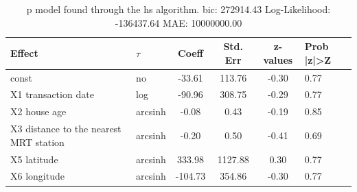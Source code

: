 \begin{table}
	\caption{p model found through the hs algorithm. bic: 272914.43 Log-Likelihood: -136437.64 MAE: 10000000.00}
	\begin{center}
		\begin{tabular}{|l|l|c|c|c|l|}
			\hline
			Effect & $\tau$ & Coeff & Std. Err & z-values & Prob |z|>Z \\
			\hline
			const & no & -33.61 & 113.76 & -0.30 & 0.77 \\
			\hline
			X1 transaction date & log & -90.96 & 308.75 & -0.29 & 0.77 \\
			\hline
			X2 house age & arcsinh & -0.08 & 0.43 & -0.19 & 0.85 \\
			\hline
			X3 distance to the nearest MRT station & arcsinh & -0.20 & 0.50 & -0.41 & 0.69 \\
			\hline
			X5 latitude & arcsinh & 333.98 & 1127.88 & 0.30 & 0.77 \\
			\hline
			X6 longitude & arcsinh & -104.73 & 354.86 & -0.30 & 0.77 \\
			\hline
		\end{tabular}
	\end{center}
\end{table}
